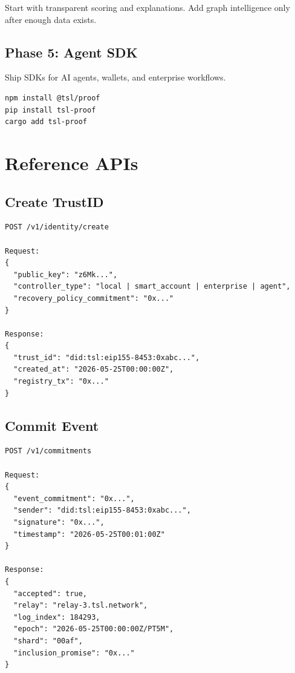 \documentclass[11pt]{article}
\begin{document}
Start with transparent scoring and explanations. Add graph intelligence only after enough data exists.

\subsection{Phase 5: Agent SDK}

Ship SDKs for AI agents, wallets, and enterprise workflows.

\begin{lstlisting}[style=tslcode]
npm install @tsl/proof
pip install tsl-proof
cargo add tsl-proof
\end{lstlisting}

\section{Reference APIs}

\subsection{Create TrustID}

\begin{lstlisting}[style=tslcode]
POST /v1/identity/create

Request:
{
  "public_key": "z6Mk...",
  "controller_type": "local | smart_account | enterprise | agent",
  "recovery_policy_commitment": "0x..."
}

Response:
{
  "trust_id": "did:tsl:eip155-8453:0xabc...",
  "created_at": "2026-05-25T00:00:00Z",
  "registry_tx": "0x..."
}
\end{lstlisting}

\subsection{Commit Event}

\begin{lstlisting}[style=tslcode]
POST /v1/commitments

Request:
{
  "event_commitment": "0x...",
  "sender": "did:tsl:eip155-8453:0xabc...",
  "signature": "0x...",
  "timestamp": "2026-05-25T00:01:00Z"
}

Response:
{
  "accepted": true,
  "relay": "relay-3.tsl.network",
  "log_index": 184293,
  "epoch": "2026-05-25T00:00:00Z/PT5M",
  "shard": "00af",
  "inclusion_promise": "0x..."
}
\end{lstlisting}
\end{document}
